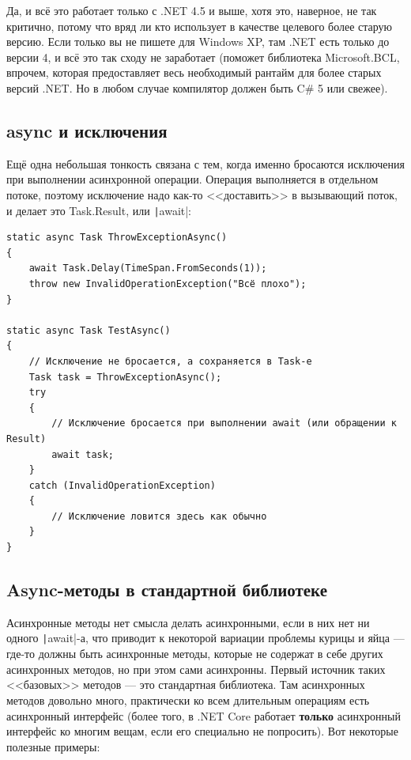 \documentclass{../../text-style}
\begin{document}
Да, и всё это работает только с .NET 4.5 и выше, хотя это, наверное, не так критично, потому что вряд ли кто использует в качестве целевого более старую версию. Если только вы не пишете для Windows XP, там .NET есть только до версии 4, и всё это так сходу не заработает (поможет библиотека Microsoft.BCL, впрочем, которая предоставляет весь необходимый рантайм для более старых версий .NET. Но в любом случае компилятор должен быть C\# 5 или свежее).

\subsection{async и исключения}

Ещё одна небольшая тонкость связана с тем, когда именно бросаются исключения при выполнении асинхронной операции. Операция выполняется в отдельном потоке, поэтому исключение надо как-то <<доставить>> в вызывающий поток, и делает это Task.Result, или \texttt|await|:

\begin{verbatim}
static async Task ThrowExceptionAsync() 
{
    await Task.Delay(TimeSpan.FromSeconds(1));
    throw new InvalidOperationException("Всё плохо");
}

static async Task TestAsync() 
{
    // Исключение не бросается, а сохраняется в Task-е
    Task task = ThrowExceptionAsync();
    try 
    {
        // Исключение бросается при выполнении await (или обращении к Result)
        await task;
    }
    catch (InvalidOperationException) 
    {
        // Исключение ловится здесь как обычно
    }
}
\end{verbatim}

\subsection{Async-методы в стандартной библиотеке}

Асинхронные методы нет смысла делать асинхронными, если в них нет ни одного \texttt|await|-а, что приводит к некоторой вариации проблемы курицы и яйца --- где-то должны быть асинхронные методы, которые не содержат в себе других асинхронных методов, но при этом сами асинхронны. Первый источник таких <<базовых>> методов --- это стандартная библиотека. Там асинхронных методов довольно много, практически ко всем длительным операциям есть асинхронный интерфейс (более того, в .NET Core работает \textbf{только} асинхронный интерфейс ко многим вещам, если его специально не попросить). Вот некоторые полезные примеры:
\end{document}
